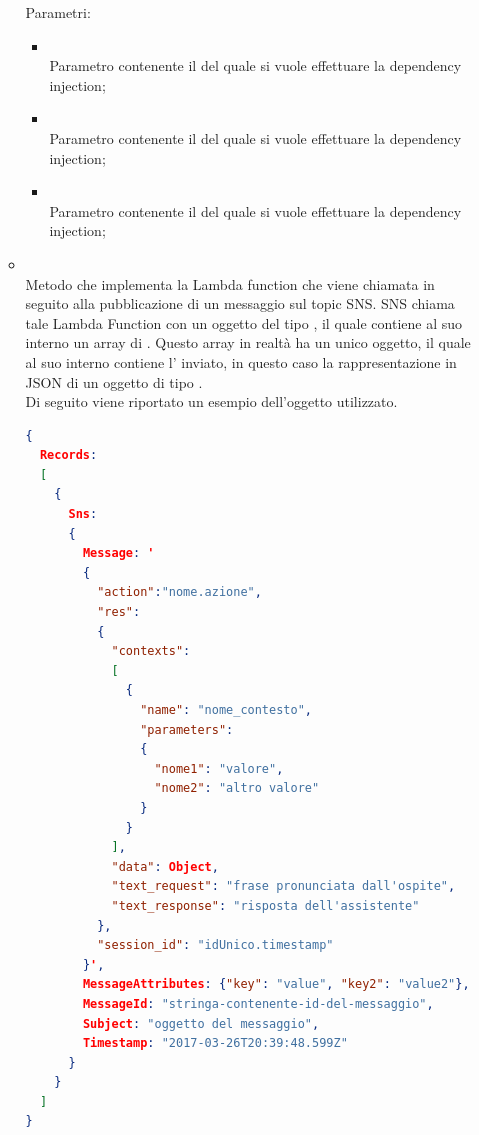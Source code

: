 \begin{itemize}
\begin{itemize}
		Parametri:
		\begin{itemize}
			\item {} \\
			Parametro contenente il  del quale si vuole effettuare la dependency injection;
			\item {} \\
			Parametro contenente il  del quale si vuole effettuare la dependency injection;
			\item {} \\
			Parametro contenente il  del quale si vuole effettuare la dependency injection;
		\end{itemize}
		\item[]  \\		Metodo che implementa la Lambda function che viene chiamata in seguito alla pubblicazione di un messaggio sul topic SNS. SNS chiama tale Lambda Function con un oggetto del tipo , il quale contiene al suo interno un array di . Questo array in realtà ha un unico oggetto, il quale al suo interno contiene l' inviato, in questo caso la rappresentazione in JSON di un oggetto di tipo . \\
Di seguito viene riportato un esempio dell'oggetto utilizzato.
\begin{lstlisting}[language=json,firstnumber=1]
{
  Records:
  [
    {
      Sns:
      {
        Message: '
        {
          "action":"nome.azione",
          "res":
          {
            "contexts":
            [
              {
                "name": "nome_contesto",
                "parameters":
                {
                  "nome1": "valore",
                  "nome2": "altro valore"
                }
              }
            ],
            "data": Object,
            "text_request": "frase pronunciata dall'ospite",
            "text_response": "risposta dell'assistente"
          },
          "session_id": "idUnico.timestamp"
        }',
        MessageAttributes: {"key": "value", "key2": "value2"},
        MessageId: "stringa-contenente-id-del-messaggio",
        Subject: "oggetto del messaggio",
        Timestamp: "2017-03-26T20:39:48.599Z"
      }
    }
  ]
}
\end{lstlisting}

\end{itemize}
\end{itemize}

